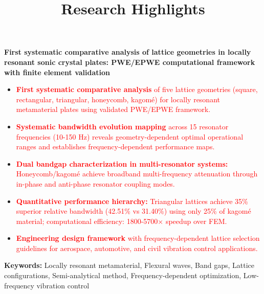 \documentclass[11pt]{article}
\title{\textbf{Research Highlights}}
\author{}
\date{}
\begin{document}
\maketitle

\vspace{-1cm}

\textbf{First systematic comparative analysis of lattice geometries in locally resonant sonic crystal plates: PWE/EPWE computational framework with finite element validation}

\vspace{0.5cm}

\begin{itemize}[leftmargin=0.5cm, itemsep=0.3cm]

\item \textcolor{red}{\textbf{First systematic comparative analysis} of five lattice geometries (square, rectangular, triangular, honeycomb, kagomé) for locally resonant metamaterial plates using validated PWE/EPWE framework.}

\item \textcolor{red}{\textbf{Systematic bandwidth evolution mapping} across 15 resonator frequencies (10-150 Hz) reveals geometry-dependent optimal operational ranges and establishes frequency-dependent performance maps.}

\item \textcolor{red}{\textbf{Dual bandgap characterization in multi-resonator systems:} Honeycomb/kagomé achieve broadband multi-frequency attenuation through in-phase and anti-phase resonator coupling modes.}

\item \textcolor{red}{\textbf{Quantitative performance hierarchy:} Triangular lattices achieve 35\% superior relative bandwidth (42.51\% vs 31.40\%) using only 25\% of kagomé material; computational efficiency: 1800-5700× speedup over FEM.}

\item \textcolor{red}{\textbf{Engineering design framework} with frequency-dependent lattice selection guidelines for aerospace, automotive, and civil vibration control applications.}

\end{itemize}

\vspace{0.5cm}

\textbf{Keywords:} Locally resonant metamaterial, Flexural waves, Band gaps, Lattice configurations, Semi-analytical method, Frequency-dependent optimization, Low-frequency vibration control
\end{document}
